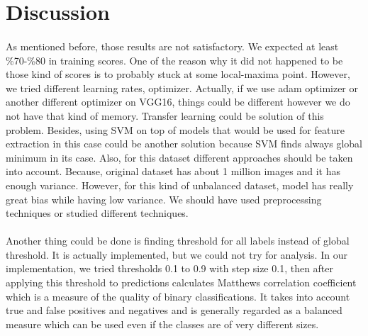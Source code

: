 \documentclass[12pt]{article}
\begin{document}
\section{Discussion}
\paragraph{}As mentioned before, those results are not satisfactory. We expected at least \%70-\%80 in training scores. One of the reason why it did not happened to be those kind of scores is to probably stuck at some local-maxima point. However, we tried different learning rates, optimizer. Actually, if we use adam optimizer or another different optimizer on VGG16, things could be different however we do not have that kind of memory. Transfer learning could be solution of this problem. Besides, using SVM on top of models that would be used for feature extraction in this case could be another solution because SVM finds always global minimum in its case. Also, for this dataset different approaches should be taken into account. Because, original dataset has about 1 million images and it has enough variance. However, for this kind of unbalanced dataset, model has really great bias while having low variance. We should have used preprocessing techniques or studied different techniques.  
\paragraph{}Another thing could be done is finding threshold for all labels instead of global threshold. It is actually implemented, but we could not try for analysis. In our implementation, we tried thresholds 0.1 to 0.9 with step size 0.1, then after applying this threshold to predictions calculates Matthews correlation coefficient which is a measure of the quality of binary classifications.\cite{matcof} It takes into account true and false positives and negatives and is generally regarded as a balanced measure which can be used even if the classes are of very different sizes. 
\end{document}
